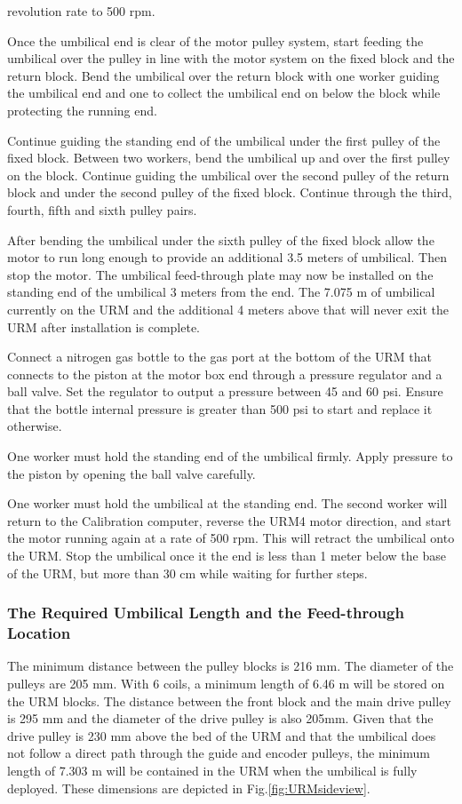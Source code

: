 \documentclass[11pt]{article}
\begin{document}
\begin{answerlist}
  revolution rate to 500 rpm.
\item Once the umbilical end is clear of the motor pulley system,
  start feeding the umbilical over the pulley in line with the motor
  system on the fixed block and the return block. Bend the umbilical
  over the return block with one worker guiding the umbilical end and
  one to collect the umbilical end on below the block while protecting
  the running end.
\item Continue guiding the standing end of the umbilical under the
  first pulley of the fixed block. Between two workers, bend the
  umbilical up and over the first pulley on the block. Continue
  guiding the umbilical over the second pulley of the return block and
  under the second pulley of the fixed block. Continue through the
  third, fourth, fifth and sixth pulley pairs.
\item After bending the umbilical under the sixth pulley of the fixed
  block allow the motor to run long enough to provide an additional 3.5
  meters of umbilical. Then stop the motor. The umbilical feed-through
  plate may now be installed on the standing end of the umbilical 3
  meters from the end. The 7.075 m of umbilical currently on the URM
  and the additional 4 meters above that will never exit the URM after
  installation is complete.
\item Connect a nitrogen gas bottle to the gas port at the bottom of
  the URM that connects to the piston at the motor box end through a
  pressure regulator and a ball valve. Set the regulator to output a
  pressure between 45 and 60 psi.  Ensure that the bottle internal
  pressure is greater than 500 psi to start and replace it otherwise.
\item One worker must hold the standing end of the umbilical
  firmly. Apply pressure to the piston by opening the ball valve
  carefully.
\item One worker must hold the umbilical at the standing end. The
  second worker will return to the Calibration computer, reverse the
  URM4 motor direction, and start the motor running again at a rate of
  500 rpm. This will retract the umbilical onto the URM. Stop the
  umbilical once it the end is less than 1 meter below the base of the
  URM, but more than 30 cm while waiting for further steps.
\end{answerlist}

\subsubsection{The Required Umbilical Length and the Feed-through Location}
The minimum distance between the pulley blocks is 216 mm. The diameter
of the pulleys are 205 mm. With 6 coils, a minimum length of 6.46 m
will be stored on the URM blocks. The distance between the front block
and the main drive pulley is 295 mm and the diameter of the drive
pulley is also 205mm. Given that the drive pulley is 230 mm above the
bed of the URM and that the umbilical does not follow a direct path
through the guide and encoder pulleys, the minimum length of 7.303 m
will be contained in the URM when the umbilical is fully
deployed. These dimensions are depicted in
Fig.\ref{fig:URMsideview}.
\end{document}
